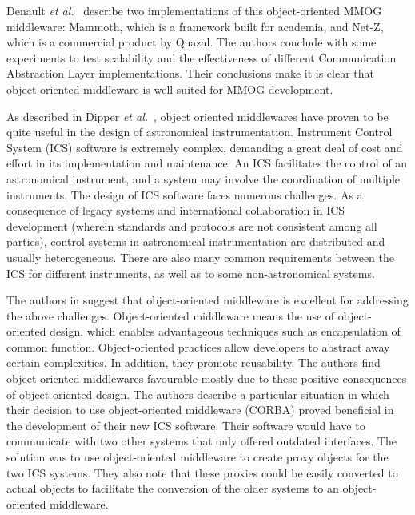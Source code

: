 \documentclass{acm_proc_article-sp}
\def\etal{{\it et al.\/}}
\begin{document}
Denault \etal\ \cite{Denault:2008p8364} describe two implementations of this object-oriented MMOG middleware: Mammoth, which is a framework built for academia, and Net-Z, which is a commercial product by Quazal.  The authors conclude with some experiments to test scalability and the effectiveness of different Communication Abstraction Layer implementations. Their conclusions make it is clear that object-oriented middleware is well suited for MMOG development.




As described in Dipper \etal\ \cite{Dipper:2004p8366}, object oriented middlewares have proven to be quite useful in the design of astronomical instrumentation.  Instrument Control System (ICS) software is extremely complex, demanding a great deal of cost and effort  in its implementation and maintenance.  An ICS facilitates the control of an astronomical instrument, and a system may involve the coordination of multiple instruments.  The design of ICS software faces numerous challenges.  As a consequence of legacy systems and international collaboration in ICS development (wherein standards and protocols are not consistent among all parties), control systems in astronomical instrumentation are distributed and usually heterogeneous.  There are also many common requirements between the ICS for different instruments, as well as to some non-astronomical systems.

The authors in \cite{Dipper:2004p8366} suggest that object-oriented middleware is excellent for addressing the above challenges.  Object-oriented middleware means the use of object-oriented design, which enables advantageous techniques such as encapsulation of common function.  Object-oriented practices allow developers to abstract away certain complexities.  In addition, they promote reusability.  The authors find object-oriented middlewares favourable mostly due to these positive consequences of object-oriented design.    The authors describe a particular situation in which their decision to use object-oriented middleware (CORBA) proved beneficial in the development of their new ICS software.  Their software would have to communicate with two other systems that only offered outdated interfaces.  The solution was to use object-oriented middleware to create proxy objects for the two ICS systems.  They also note that these proxies could be easily converted to actual objects to facilitate the conversion of the older systems to an object-oriented middleware.
\end{document}
